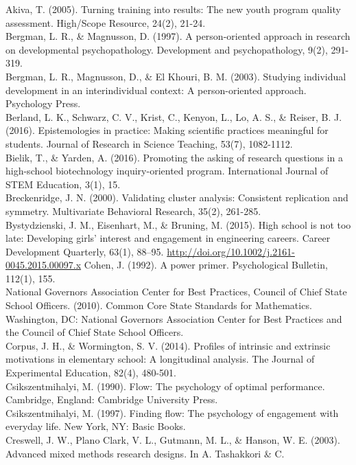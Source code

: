\documentclass[]{book}
\theoremstyle{definition}
\theoremstyle{definition}
\theoremstyle{definition}
\theoremstyle{remark}
\begin{document}
Akiva, T. (2005). Turning training into results: The new youth program
quality assessment. High/Scope Resource, 24(2), 21-24.\\
Bergman, L. R., \& Magnusson, D. (1997). A person-oriented approach in
research on developmental psychopathology. Development and
psychopathology, 9(2), 291-319.\\
Bergman, L. R., Magnusson, D., \& El Khouri, B. M. (2003). Studying
individual development in an interindividual context: A person-oriented
approach. Psychology Press.\\
Berland, L. K., Schwarz, C. V., Krist, C., Kenyon, L., Lo, A. S., \&
Reiser, B. J. (2016). Epistemologies in practice: Making scientific
practices meaningful for students. Journal of Research in Science
Teaching, 53(7), 1082-1112.\\
Bielik, T., \& Yarden, A. (2016). Promoting the asking of research
questions in a high-school biotechnology inquiry-oriented program.
International Journal of STEM Education, 3(1), 15.\\
Breckenridge, J. N. (2000). Validating cluster analysis: Consistent
replication and symmetry. Multivariate Behavioral Research, 35(2),
261-285.\\
Bystydzienski, J. M., Eisenhart, M., \& Bruning, M. (2015). High school
is not too late: Developing girls' interest and engagement in
engineering careers. Career Development Quarterly, 63(1), 88--95.
\url{http://doi.org/10.1002/j.2161-0045.2015.00097.x} Cohen, J. (1992).
A power primer. Psychological Bulletin, 112(1), 155.\\
National Governors Association Center for Best Practices, Council of
Chief State School Officers. (2010). Common Core State Standards for
Mathematics. Washington, DC: National Governors Association Center for
Best Practices and the Council of Chief State School Officers.\\
Corpus, J. H., \& Wormington, S. V. (2014). Profiles of intrinsic and
extrinsic motivations in elementary school: A longitudinal analysis. The
Journal of Experimental Education, 82(4), 480-501.\\
Csikszentmihalyi, M. (1990). Flow: The psychology of optimal
performance. Cambridge, England: Cambridge University Press.\\
Csikszentmihalyi, M. (1997). Finding flow: The psychology of engagement
with everyday life. New York, NY: Basic Books.\\
Creswell, J. W., Plano Clark, V. L., Gutmann, M. L., \& Hanson, W. E.
(2003). Advanced mixed methods research designs. In A. Tashakkori \& C.
\end{document}
